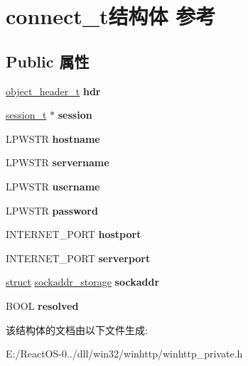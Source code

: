 \hypertarget{structconnect__t}{}\section{connect\+\_\+t结构体 参考}
\label{structconnect__t}
\subsection*{Public 属性}
\begin{DoxyCompactItemize}
\item 
\mbox{\label{structconnect__t_a7a1bd6d27ed92df46ab8363d853a7948}} 
\hyperlink{struct__object__header__t}{object\+\_\+header\+\_\+t} {\bfseries hdr}
\item 
\mbox{\label{structconnect__t_a2358c2efdf92c79cd1e4467211fba09a}} 
\hyperlink{structsession__t}{session\+\_\+t} $\ast$ {\bfseries session}
\item 
\mbox{\label{structconnect__t_a34bd490effed04e3b3427e46e0963723}} 
L\+P\+W\+S\+TR {\bfseries hostname}
\item 
\mbox{\label{structconnect__t_a8110022bf5290e764e5f4bb158ebbb87}} 
L\+P\+W\+S\+TR {\bfseries servername}
\item 
\mbox{\label{structconnect__t_a6a0aeea428b0f851f07f73f32b2184f1}} 
L\+P\+W\+S\+TR {\bfseries username}
\item 
\mbox{\label{structconnect__t_a46050906d4f912a2da12f81a36838df3}} 
L\+P\+W\+S\+TR {\bfseries password}
\item 
\mbox{\label{structconnect__t_a1a298fcb85393cde3a86cc4add25c98b}} 
I\+N\+T\+E\+R\+N\+E\+T\+\_\+\+P\+O\+RT {\bfseries hostport}
\item 
\mbox{\label{structconnect__t_ac7b46bc4a6102313318f1f1f7e56f006}} 
I\+N\+T\+E\+R\+N\+E\+T\+\_\+\+P\+O\+RT {\bfseries serverport}
\item 
\mbox{\label{structconnect__t_a979a6ba852b8b2c3a58ebf8dee5efe6c}} 
\hyperlink{interfacestruct}{struct} \hyperlink{structsockaddr__storage}{sockaddr\+\_\+storage} {\bfseries sockaddr}
\item 
\mbox{\label{structconnect__t_a6e2dc56bb4d3ec2d55051fa231961eaf}} 
B\+O\+OL {\bfseries resolved}
\end{DoxyCompactItemize}


该结构体的文档由以下文件生成\+:\begin{DoxyCompactItemize}
\item 
E\+:/\+React\+O\+S-\/0../dll/win32/winhttp/winhttp\+\_\+private.\+h\end{DoxyCompactItemize}
